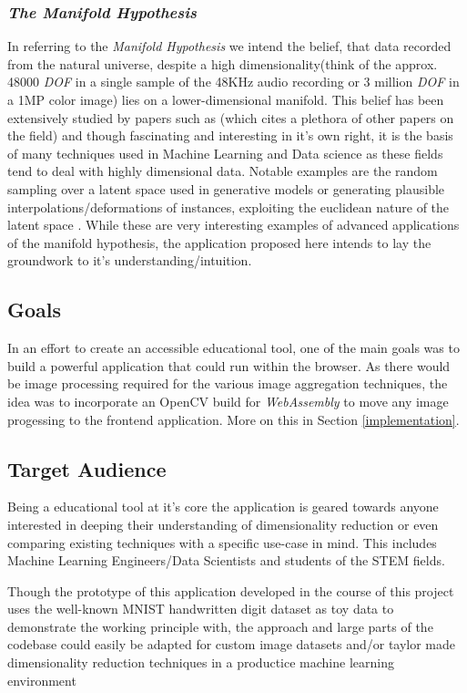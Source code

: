 \documentclass[11pt,a4paper]{article}
\begin{document}
  \subsubsection*{ \textit{The Manifold Hypothesis}}
  In referring to the \textit{Manifold Hypothesis} we intend the belief, that data recorded from the natural universe, despite a high dimensionality(think of the  approx. 48000 \textit{DOF} in a single sample of the 48KHz audio recording or 3 million \textit{DOF} in a 1MP color image) lies on a lower-dimensional manifold. This belief has been extensively studied by papers such as \cite{fefferman_testing_2016}(which cites a plethora of other papers on the field) and though fascinating and interesting in it's own right, it is the basis of many techniques used in Machine Learning and Data science as these fields tend to deal with highly dimensional data. 
  Notable examples are the random sampling over a latent space used in generative models \cite{razavi_generating_2019} or generating plausible interpolations/deformations of instances, exploiting the euclidean nature of the latent space \cite{cosmo_limp_2020}.
  While these are very interesting examples of advanced applications of the manifold hypothesis, the application proposed here intends to lay the groundwork to it's understanding/intuition.

  \subsection {Goals}
    In an effort to create an accessible educational tool, one of the main goals was to build a powerful application that could run within the browser. As there would be image processing required for the various image aggregation techniques, the idea was to incorporate an OpenCV build for \textit{WebAssembly} to move any image progessing to the frontend application. More on this in Section \ref{implementation}.
  \subsection{Target Audience}
    Being a educational tool at it's core the application is geared towards anyone interested in deeping their understanding of dimensionality reduction or even comparing existing techniques with a specific use-case in mind. This includes Machine Learning Engineers/Data Scientists and students of the STEM fields.

    Though the prototype of this application developed in the course of this project uses the well-known MNIST handwritten digit dataset as toy data to demonstrate the working principle with, the approach and large parts of the codebase could easily  be adapted for custom image datasets and/or taylor made dimensionality reduction techniques in a productice machine learning environment
\end{document}
